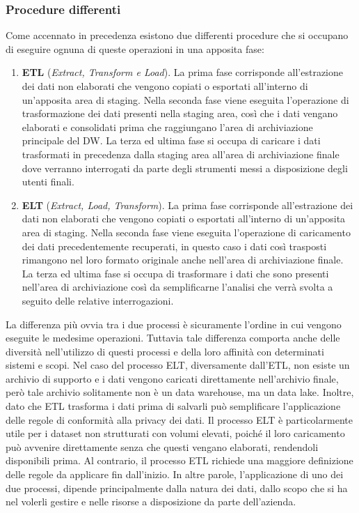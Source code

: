 \subsubsection{Procedure differenti}

Come accennato in precedenza esistono due differenti procedure che si occupano di eseguire ognuna di queste operazioni in una apposita fase:

\begin{enumerate}
    \item \textbf{ETL} (\textit{Extract, Transform e Load}). La prima fase corrisponde all’estrazione dei dati non elaborati che vengono copiati o esportati all’interno di un’apposita area di staging. Nella seconda fase viene eseguita l’operazione di trasformazione dei dati presenti nella staging area, così che i dati vengano elaborati e consolidati prima che raggiungano l’area di archiviazione principale del DW. La terza ed ultima fase si occupa di caricare i dati trasformati in precedenza dalla staging area all’area di archiviazione finale dove verranno interrogati da parte degli strumenti messi a disposizione degli utenti finali.\cite{talend_etl}
    \item \textbf{ELT} (\textit{Extract, Load, Transform}). La prima fase corrisponde all’estrazione dei dati non elaborati che vengono copiati o esportati all’interno di un’apposita area di staging. Nella seconda fase viene eseguita l’operazione di caricamento dei dati precedentemente recuperati, in questo caso i dati così trasposti rimangono nel loro formato originale anche nell’area di archiviazione finale. La terza ed ultima fase si occupa di trasformare i dati che sono presenti nell’area di archiviazione così da semplificarne l’analisi che verrà svolta a seguito delle relative interrogazioni.\cite{talend_etl_vs_elt}
\end{enumerate}

La differenza più ovvia tra i due processi è sicuramente l’ordine in cui vengono eseguite le medesime operazioni. Tuttavia tale differenza comporta anche delle diversità nell’utilizzo di questi processi e della loro affinità con determinati sistemi e scopi. Nel caso del processo ELT, diversamente dall’ETL, non esiste un archivio di supporto e i dati vengono caricati direttamente nell’archivio finale, però tale archivio solitamente non è un data warehouse, ma un data lake. Inoltre, dato che ETL trasforma i dati prima di salvarli può semplificare l’applicazione delle regole di conformità alla privacy dei dati.\cite{ibm_elt}
Il processo ELT è particolarmente utile per i dataset non strutturati con volumi elevati, poiché il loro caricamento può avvenire direttamente senza che questi vengano elaborati, rendendoli disponibili prima. Al contrario, il processo ETL richiede una maggiore definizione delle regole da applicare fin dall’inizio.\cite{ibm_etl}
In altre parole, l’applicazione di uno dei due processi, dipende principalmente dalla natura dei dati, dallo scopo che si ha nel volerli gestire e nelle risorse a disposizione da parte dell’azienda.

